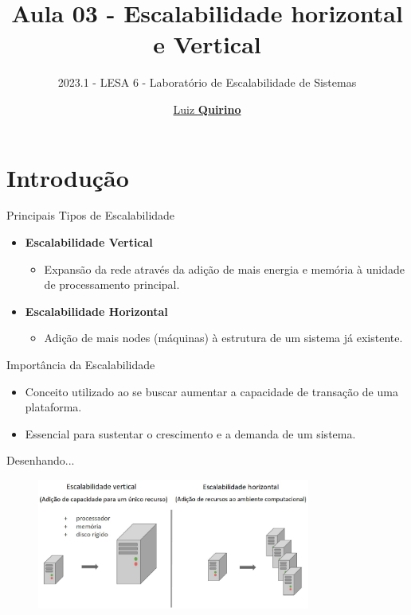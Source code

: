 \documentclass{beamer}
\title{Aula 03 - Escalabilidade horizontal e Vertical}
\subtitle{2023.1 - LESA 6 -  Laboratório de Escalabilidade de Sistemas}
\author{\href{mailto:luiz.quirino@ifsp.edu.br}{Luiz \textbf{Quirino}}}
\begin{document}
\maketitle
{}
\section{Introdução}

\begin{frame}{Principais Tipos de Escalabilidade}
	\begin{itemize}
		\item \textbf{Escalabilidade Vertical}
		      \begin{itemize}
			      \item Expansão da rede através da adição de mais energia e memória à unidade de processamento principal.
		      \end{itemize}

		\item \textbf{Escalabilidade Horizontal}
		      \begin{itemize}
			      \item Adição de mais nodes (máquinas) à estrutura de um sistema já existente.
		      \end{itemize}
	\end{itemize}
\end{frame}
\begin{frame}{Importância da Escalabilidade}
	\begin{itemize}
		\item Conceito utilizado ao se buscar aumentar a capacidade de transação de uma plataforma.
		\item Essencial para sustentar o crescimento e a demanda de um sistema.
	\end{itemize}
\end{frame}

\begin{frame}[fragile]{Desenhando...}

	\begin{figure}[H]
		\centerline{\includegraphics[width=0.8\textwidth]{assets/lesa6/Figura-1.2-Escalabilidade-Vertical-x-Escalabilidade-Horizontal.-Adaptado-de-MARQUESONE-2017.png}}

	\end{figure}
\end{frame}
\end{document}
